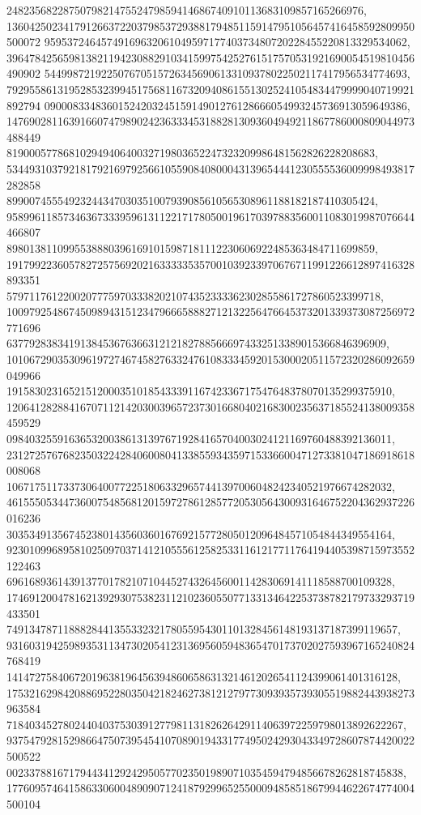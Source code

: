 \documentclass[12pt]{article}
\begin{document}
248235682287507982147552479859414686740910113683109857165266976, 
136042502341791266372203798537293881794851159147951056457416458592809950500072
9595372464574916963206104959717740373480720228455220813329534062, 
396478425659813821194230882910341599754252761517570531921690054519810456490902
5449987219225076705157263456906133109378022502117417956534774693, 
792955861319528532399451756811673209408615513025241054834479999040719921892794
0900083348360152420324515914901276128666054993245736913059649386, 
147690281163916607479890242363334531882813093604949211867786000809044973488449
81900057786810294940640032719803652247323209986481562826228208683, 
534493103792181792169792566105590840800043139654441230555536009998493817282858
89900745554923244347030351007939085610565308961188182187410305424, 
958996118573463673339596131122171780500196170397883560011083019987076644466807
89801381109955388803961691015987181112230606922485363484711699859, 
191799223605782725756920216333335357001039233970676711991226612897416328893351
579711761220020777597033382021074352333362302855861727860523399718, 
100979254867450989431512347966658882712132256476645373201339373087256972771696
6377928383419138453676366312121827885666974332513389015366846396909, 
101067290353096197274674582763324761083334592015300020511572320286092659049966
19158302316521512000351018543339116742336717547648378070135299375910, 
120641282884167071121420300396572373016680402168300235637185524138009358459529
09840325591636532003861313976719284165704003024121169760488392136011, 
231272576768235032242840600804133855934359715336600471273381047186918618008068
10671751173373064007722518063329657441397006048242340521976674282032, 
461555053447360075485681201597278612857720530564300931646752204362937226016236
30353491356745238014356036016769215772805012096484571054844349554164, 
923010996895810250970371412105556125825331161217711764194405398715973552122463
69616893614391377017821071044527432645600114283069141118588700109328, 
174691200478162139293075382311210236055077133134642253738782179733293719433501
749134787118882844135533232178055954301101328456148193137187399119657, 
931603194259893531134730205412313695605948365470173702027593967165240824768419
141472758406720196381964563948606586313214612026541124399061401316128, 
175321629842088695228035042182462738121279773093935739305519882443938273963584
7184034527802440403753039127798113182626429114063972259798013892622267, 
937547928152986647507395454107089019433177495024293043349728607874420022500522
0023378816717944341292429505770235019890710354594794856678262818745838, 
177609574641586330600489090712418792996525500094858518679944622674774004500104
\end{document}
